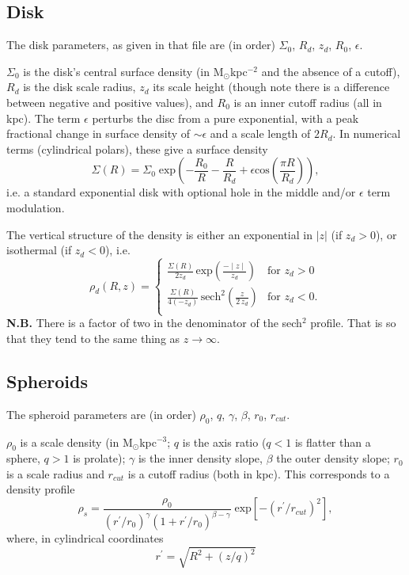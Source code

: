 \documentclass{article}
\begin{document}
\subsection{Disk}

The disk parameters, as given in that file are (in order) $\Sigma_0$,
$R_d$, $z_d$, $R_0$, $\epsilon$. 

$\Sigma_0$ is the disk's central surface density (in M$_\odot$kpc$^{-2}$
and the absence of a cutoff), $R_d$ is the disk
scale radius, $z_d$ its scale height (though note there is a
difference between negative and positive values), and $R_0$ is an inner
cutoff radius (all in kpc). The term $\epsilon$ perturbs the disc from a pure exponential, with a peak fractional change in surface density of $\sim\epsilon$ and a scale length of $2R_d$. In numerical terms (cylindrical polars), these
give a surface density
\begin{equation}
\Sigma(R)=\Sigma_0\;\textrm{exp}\left(-\frac{R_0}{R}-\frac{R}{R_d}+
  \epsilon\textrm{cos}\left(\frac{\pi R}{R_d}\right)\right),
\end{equation}
i.e. a standard exponential disk with optional hole in the middle and/or
$\epsilon$ term modulation.

The vertical structure of the density is either an exponential in
$|z|$ (if $z_d>0$), or isothermal (if $z_d<0$), i.e.
\begin{equation}
\rho_d(R,z)=\left\{\begin{array}{lc}\frac{\Sigma(R)}{2z_d}\,\textrm{exp}\left(\frac{-\mid
        z\mid}{z_d}\right) & \textrm{for }z_d > 0 \\
\frac{\Sigma(R)}{4(-z_d)}\,\textrm{sech}^2\left(\frac{z}{2\,z_d}\right)
& \textrm{for } z_d
< 0.\\\end{array}\right. 
\end{equation}
{\bf N.B.} There is a factor of two in the denominator of the sech$^2$
profile. That is so that they tend to the same thing as
$z\rightarrow\infty$.

\subsection{Spheroids}

The spheroid parameters are (in order) $\rho_0$, $q$, $\gamma$,
$\beta$, $r_0$, $r_{cut}$.

$\rho_0$ is a scale density (in M$_\odot$kpc$^{-3}$; $q$ is the axis ratio ($q<1$ is flatter
than a sphere, $q>1$ is prolate); $\gamma$ is the inner density slope,
$\beta$ the outer density slope; $r_0$ is a scale radius and $r_{cut}$
is a cutoff radius (both in kpc). This corresponds to a density profile
\begin{equation}
\rho_s=\frac{\rho_0}{(r^\prime/r_0)^\gamma(1+r^\prime/r_0)^{\beta-\gamma}}\; 
\textrm{exp}\left[-\left(r^\prime/r_{cut}\right)^2\right],
\end{equation}
where, in cylindrical coordinates
\begin{equation}
r^\prime = \sqrt{R^2 + (z/q)^2}
\end{equation}
\end{document}
